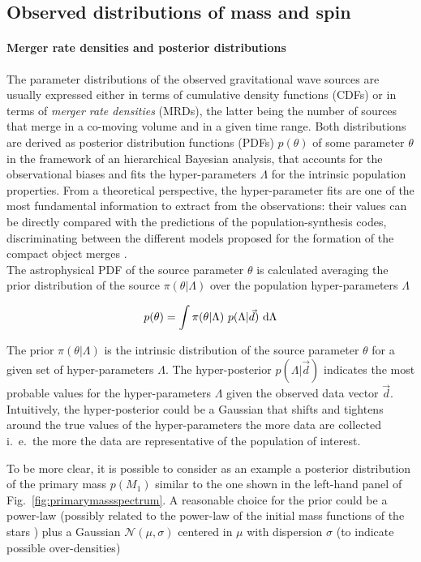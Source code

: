 \documentclass[a4paper,titlepage]{book}     	%
\begin{document}
\subsection{Observed distributions of mass and spin}\label{subsec:GWmassspin}

\paragraph{Merger rate densities and posterior distributions}
The parameter distributions of the observed gravitational wave sources are usually expressed either in terms of cumulative density functions (CDFs) or in terms of \emph{merger rate densities} (MRDs), the latter being the number of sources that merge in a co-moving volume and in a given time range. Both distributions are derived as posterior distribution functions (PDFs) $p(\theta)$ of some parameter $\theta$ in the framework of an hierarchical Bayesian analysis, that accounts for the observational biases and fits the hyper-parameters $\Lambda$ for the intrinsic population properties. From a theoretical perspective, the hyper-parameter fits are one of the most fundamental information to extract from the observations: their values can be directly compared with the predictions of the population-synthesis codes, discriminating between the different models proposed for the formation of the compact object merges \cite{GWTC-3_interpretation, BayesforGW}. \\

The astrophysical PDF of the source parameter $\theta$ is calculated averaging the prior distribution of the source $\pi(\theta|\Lambda)$ over the population hyper-parameters $\Lambda$

\begin{equation}\label{eq:posteriorMRD}
    p(\theta) = \int \pi(\theta|\Lambda)~p(\Lambda|\vec{d})~\rm d \Lambda
\end{equation}

The prior $\pi(\theta|\Lambda)$ is the intrinsic distribution of the source parameter $\theta$ for a given set of hyper-parameters $\Lambda$. The hyper-posterior $p(\Lambda|\vec{d})$ indicates the most probable values for the hyper-parameters $\Lambda$ given the observed data vector $\vec{d}$. Intuitively, the hyper-posterior could be a Gaussian that shifts and tightens around the true values of the hyper-parameters the more data are collected i.\ e.\ the more the data are representative of the population of interest.

To be more clear, it is possible to consider as an example a posterior distribution of the primary mass $p(M_1)$ similar to the one shown in the left-hand panel of Fig.\ \ref{fig:primarymassspectrum}. A reasonable choice for the prior could be a power-law (possibly related to the power-law of the initial mass functions of the stars \cite{Kroupa2001}) plus a Gaussian $\mathcal{N} (\mu,\sigma)$ centered in $\mu$ with dispersion $\sigma$ (to indicate possible over-densities) %
\end{document}
